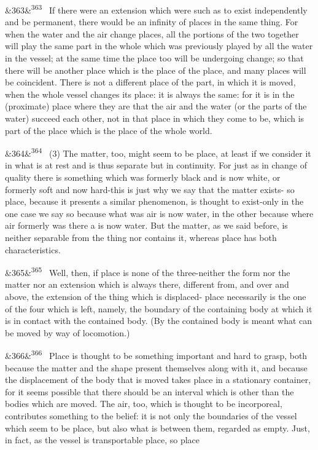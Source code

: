 \documentclass[12pt]{article}
\newcommand{\para}[1][]{\par\noindent\ifx&#1&\else\textsuperscript{\footnotesize #1}~\fi}
\begin{document}
\para[363] If there were an extension which were such as to exist independently and be permanent, there would be an infinity of places in the same thing. For when the water and the air change places, all the portions of the two together will play the same part in the whole which was previously played by all the water in the vessel; at the same time the place too will be undergoing change; so that there will be another place which is the place of the place, and many places will be coincident. There is not a different place of the part, in which it is moved, when the whole vessel changes its place: it is always the same: for it is in the (proximate) place where they are that the air and the water (or the parts of the water) succeed each other, not in that place in which they come to be, which is part of the place which is the place of the whole world.

\para[364] (3) The matter, too, might seem to be place, at least if we consider it in what is at rest and is thus separate but in continuity. For just as in change of quality there is something which was formerly black and is now white, or formerly soft and now hard-this is just why we say that the matter exists- so place, because it presents a similar phenomenon, is thought to exist-only in the one case we say so because what was air is now water, in the other because where air formerly was there a is now water. But the matter, as we said before, is neither separable from the thing nor contains it, whereas place has both characteristics.

\para[365] Well, then, if place is none of the three-neither the form nor the matter nor an extension which is always there, different from, and over and above, the extension of the thing which is displaced- place necessarily is the one of the four which is left, namely, the boundary of the containing body at which it is in contact with the contained body. (By the contained body is meant what can be moved by way of locomotion.)

\para[366] Place is thought to be something important and hard to grasp, both because the matter and the shape present themselves along with it, and because the displacement of the body that is moved takes place in a stationary container, for it seems possible that there should be an interval which is other than the bodies which are moved. The air, too, which is thought to be incorporeal, contributes something to the belief: it is not only the boundaries of the vessel which seem to be place, but also what is between them, regarded as empty. Just, in fact, as the vessel is transportable place, so place
\end{document}
